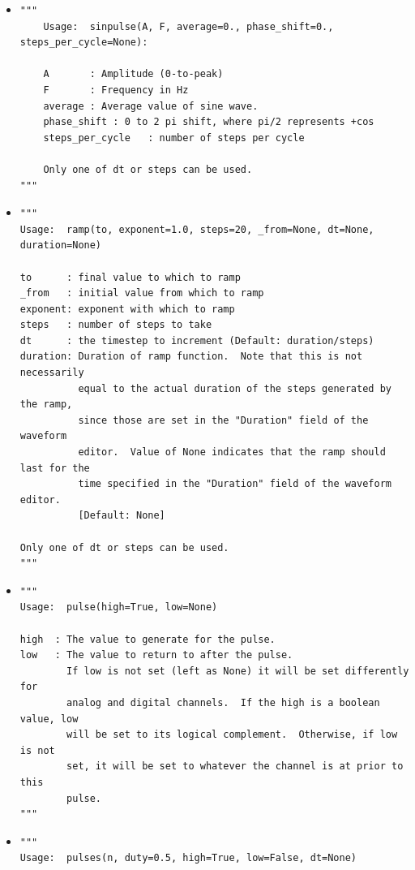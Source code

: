 \begin{itemize}

\item {}
\begin{lstlisting}
"""
    Usage:  sinpulse(A, F, average=0., phase_shift=0., steps_per_cycle=None):

    A       : Amplitude (0-to-peak)
    F       : Frequency in Hz
    average : Average value of sine wave.
    phase_shift : 0 to 2 pi shift, where pi/2 represents +cos
    steps_per_cycle   : number of steps per cycle

    Only one of dt or steps can be used.
"""
\end{lstlisting}

\item {}
\begin{lstlisting}
"""
Usage:  ramp(to, exponent=1.0, steps=20, _from=None, dt=None, duration=None)

to      : final value to which to ramp
_from   : initial value from which to ramp
exponent: exponent with which to ramp
steps   : number of steps to take
dt      : the timestep to increment (Default: duration/steps)
duration: Duration of ramp function.  Note that this is not necessarily
          equal to the actual duration of the steps generated by the ramp,
          since those are set in the "Duration" field of the waveform
          editor.  Value of None indicates that the ramp should last for the
          time specified in the "Duration" field of the waveform editor.
          [Default: None]

Only one of dt or steps can be used.
"""
\end{lstlisting}

\item {}
\begin{lstlisting}
"""
Usage:  pulse(high=True, low=None)

high  : The value to generate for the pulse.
low   : The value to return to after the pulse.
        If low is not set (left as None) it will be set differently for
        analog and digital channels.  If the high is a boolean value, low
        will be set to its logical complement.  Otherwise, if low is not
        set, it will be set to whatever the channel is at prior to this
        pulse.
"""
\end{lstlisting}

\item {}
\begin{lstlisting}
"""
Usage:  pulses(n, duty=0.5, high=True, low=False, dt=None)


\end{lstlisting}
\end{itemize}
